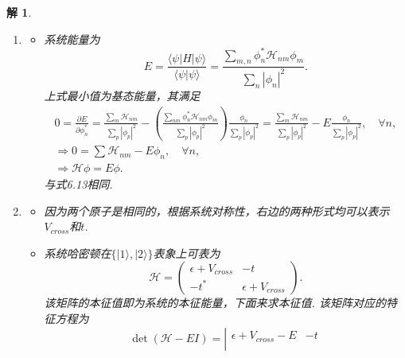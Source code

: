 \documentclass[UTF8,10pt,a4paper]{article}
\theoremstyle{Problem}
\theoremstyle{Solution}
\newtheorem*{sol}{解}
\providecommand{\abs}[1]{\left\lvert#1\right\rvert}
\begin{document}
\begin{sol}
    \begin{enumerate}
        \item[(a)] 
        \begin{itemize}
            \item[$\triangleright$] 系统能量为
            \begin{equation}
                E=\frac{\langle\psi\lvert H\rvert\psi\rangle}{\langle\psi\vert\psi\rangle}=\frac{\sum_{m,n}\phi_n^*\mathcal{H}_{nm}\phi_m}{\sum_n\abs{\phi_n}^2}.
            \end{equation}
            上式最小值为基态能量，其满足
            \begin{gather}
                0=\frac{\partial E}{\partial\phi_n^*}=\frac{\sum_m\mathcal{H}_{nm}}{\sum_p\abs{\phi_p}^2}-\left(\frac{\sum_{nm}\phi_n^*\mathcal{H}_{nm}\phi_m}{\sum_p\abs{\phi_p}^2}\right)\frac{\phi_n}{\sum_p\abs{\phi_p}^2}=\frac{\sum_m\mathcal{H}_{nm}}{\sum_p\abs{\phi_p}^2}-E\frac{\phi_n}{\sum_p\abs{\phi_p}^2},\quad\forall n,\\
                \Longrightarrow 0=\sum\mathcal{H}_{nm}-E\phi_n,\quad\forall n,\\
                \Longrightarrow \mathcal{H}\phi=E\phi.
            \end{gather}
            与式6.13相同.
        \end{itemize}
        \item[(b)] 
        \begin{itemize}
            \item[$\triangleright$] 因为两个原子是相同的，根据系统对称性，右边的两种形式均可以表示$V_{cross}$和$t$.
            \item[$\triangleright$] 系统哈密顿在$\{\lvert 1\rangle,\rvert 2\rangle\}$表象上可表为
            \begin{equation}
                \mathcal{H}=\left(\begin{matrix}
                    \epsilon+V_{cross}&-t\\
                    -t^*&\epsilon+V_{cross}
                \end{matrix}\right).
            \end{equation}
            该矩阵的本征值即为系统的本征能量，下面来求本征值. 该矩阵对应的特征方程为
            \begin{equation}
                \det(\mathcal{H}-EI)=\left\lvert\begin{matrix}
                    \epsilon+V_{cross}-E&-t\\

\end{matrix}
\end{equation}
\end{itemize}
\end{enumerate}
\end{sol}
\end{document}
